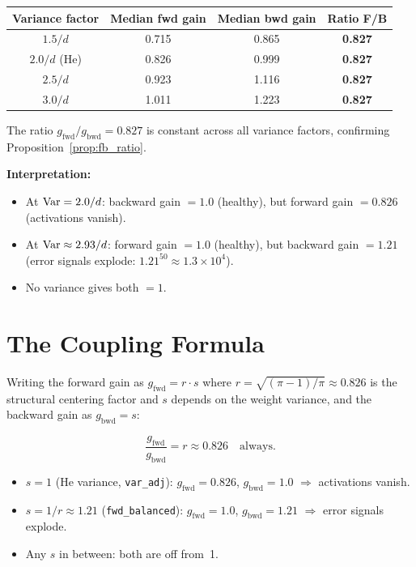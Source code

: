 \begin{center}
\begin{tabular}{cccc}
\toprule
Variance factor & Median fwd gain & Median bwd gain & Ratio F/B \\
\midrule
$1.5/d$ & 0.715 & 0.865 & \textbf{0.827} \\
$2.0/d$ (He) & 0.826 & 0.999 & \textbf{0.827} \\
$2.5/d$ & 0.923 & 1.116 & \textbf{0.827} \\
$3.0/d$ & 1.011 & 1.223 & \textbf{0.827} \\
\bottomrule
\end{tabular}
\end{center}

The ratio $g_{\mathrm{fwd}}/g_{\mathrm{bwd}} = 0.827$ is constant
across all variance factors, confirming
Proposition~\ref{prop:fb_ratio}.

\textbf{Interpretation:}
\begin{itemize}
  \item At $\operatorname{Var} = 2.0/d$: backward gain $= 1.0$ (healthy), but
        forward gain $= 0.826$ (activations vanish).
  \item At $\operatorname{Var} \approx 2.93/d$: forward gain $= 1.0$ (healthy), but
        backward gain $= 1.21$ (error signals explode:
        $1.21^{50} \approx 1.3 \times 10^4$).
  \item No variance gives both $= 1$.
\end{itemize}

\section{The Coupling Formula}
\label{sec:fwd_bwd_coupling}

Writing the forward gain as $g_{\mathrm{fwd}} = r \cdot s$ where
$r = \sqrt{(\pi-1)/\pi} \approx 0.826$ is the structural centering
factor and $s$ depends on the weight variance, and the backward gain as
$g_{\mathrm{bwd}} = s$:

\begin{equation}\label{eq:coupling}
  \frac{g_{\mathrm{fwd}}}{g_{\mathrm{bwd}}} = r \approx 0.826
  \quad\text{always.}
\end{equation}

\begin{itemize}
  \item $s = 1$ (He variance, \texttt{var\_adj}):
        $g_{\mathrm{fwd}} = 0.826$, $g_{\mathrm{bwd}} = 1.0$
        $\Rightarrow$ activations vanish.
  \item $s = 1/r \approx 1.21$ (\texttt{fwd\_balanced}):
        $g_{\mathrm{fwd}} = 1.0$, $g_{\mathrm{bwd}} = 1.21$
        $\Rightarrow$ error signals explode.
  \item Any $s$ in between: both are off from~1.
\end{itemize}

